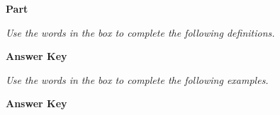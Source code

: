 \documentclass[../Exercise.tex]{subfiles}
\begin{document}
\begin{center}
	\large{\textbf{Part }}
\end{center} 

\noindent \textit{Use the words in the box to complete the following definitions.}

\begin{framed}
\end{framed}
\vspace{7ex}
\begin{framed}
\textbf{Answer Key}
\begin{multicols}{3}
\end{multicols}
\end{framed}
\vspace{7ex}

\noindent \textit{Use the words in the box to complete the following examples.}


\begin{framed}
\end{framed}
\vspace{7ex}
\begin{framed}
\textbf{Answer Key}
\begin{multicols}{3}
\end{multicols}
\end{framed}
\vspace{7ex}
\end{document}
